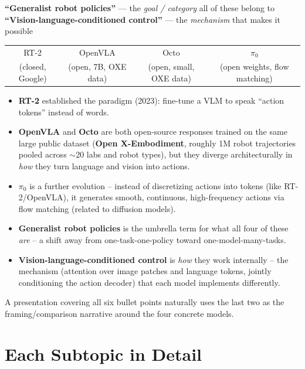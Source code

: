 \documentclass[a4paper,11pt]{article}
\begin{document}
\begin{center}
\begin{minipage}{0.85\linewidth}
\centering
\textbf{``Generalist robot policies''} --- the \emph{goal / category} all of these belong to\\
\textbf{``Vision-language-conditioned control''} --- the \emph{mechanism} that makes it possible\\[8pt]
\begin{tabular}{cccc}
RT-2 & OpenVLA & Octo & $\pi_0$ \\
(closed, Google) & (open, 7B, OXE data) & (open, small, OXE data) & (open weights, flow matching)
\end{tabular}
\end{minipage}
\end{center}

\begin{itemize}
	\item \textbf{RT-2} established the paradigm (2023): fine-tune a VLM to speak ``action tokens'' instead of words.
	\item \textbf{OpenVLA} and \textbf{Octo} are both open-source responses trained on the same large public dataset (\textbf{Open X-Embodiment}, roughly 1M robot trajectories pooled across $\sim$20 labs and robot types), but they diverge architecturally in \emph{how} they turn language and vision into actions.
	\item \textbf{$\pi_0$} is a further evolution -- instead of discretizing actions into tokens (like RT-2/OpenVLA), it generates smooth, continuous, high-frequency actions via flow matching (related to diffusion models).
	\item \textbf{Generalist robot policies} is the umbrella term for what all four of these \emph{are} -- a shift away from one-task-one-policy toward one-model-many-tasks.
	\item \textbf{Vision-language-conditioned control} is \emph{how} they work internally -- the mechanism (attention over image patches and language tokens, jointly conditioning the action decoder) that each model implements differently.
\end{itemize}

A presentation covering all six bullet points naturally uses the last two as the framing/comparison narrative around the four concrete models.

\section{Each Subtopic in Detail}
\end{document}
